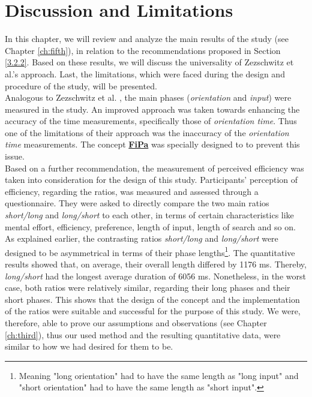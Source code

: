 
\chapter{Discussion and Limitations}\label{ch:sixth}

In this chapter, we will review and analyze the main results of the study (see Chapter \ref{ch:fifth}), in relation to the recommendations proposed in Section \ref{3.2.2}. Based on these results, we will discuss the universality of Zezschwitz et al.'s \cite{Zezschwitz} approach. Last, the limitations, which were faced during the design and procedure of the study, will be presented.\\

Analogous to Zezschwitz et al. \cite{Zezschwitz}, the main phases (\textit{orientation} and \textit{input}) were measured in the study. An improved approach was taken towards enhancing the accuracy of the time measurements, specifically those of \textit{orientation time}. Thus one of the limitations of their approach was the inaccuracy of the \textit{orientation time} measurements. The concept \underline{\textbf{FiPa}} was specially designed to to prevent this issue. \\
Based on a further recommendation, the measurement of perceived efficiency was taken into consideration for the design of this study. Participants' perception of efficiency, regarding the ratios, was measured and assessed through a questionnaire. They were asked to directly compare the two main ratios \textit{short/long} and \textit{long/short} to each other, in terms of certain characteristics like mental effort, efficiency, preference, length of input, length of search and so on. \\

As explained earlier, the contrasting ratios \textit{short/long} and \textit{long/short} were designed to be asymmetrical in terms of their phase lengths\footnote{Meaning "long orientation" had to have the same length as "long input" and "short orientation" had to have the same length as "short input".}. The quantitative results showed that, on average, their overall length differed by 1176 ms. Thereby, \textit{long/short} had the longest average duration of 6056 ms.
Nonetheless, in the worst case, both ratios were relatively similar, regarding their long phases and their short phases. This shows that the design of the concept and the implementation of the ratios were suitable and successful for the purpose of this study. We were, therefore, able to prove our assumptions and observations (see Chapter \ref{ch:third}), thus our used method and the resulting quantitative data, were similar to how we had desired for them to be. \\

